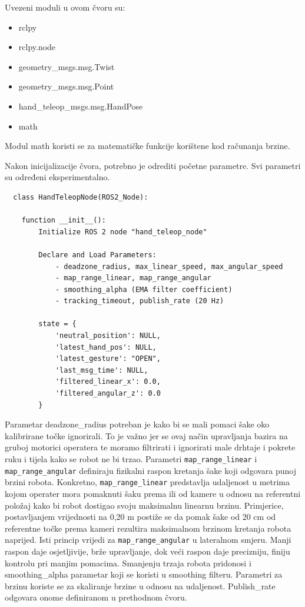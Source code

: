 \documentclass[12pt,a4paper,oneside]{report}
\begin{document}
Uvezeni moduli u ovom čvoru su:
\begin{itemize}
  \item rclpy
  \item rclpy.node
  \item geometry\_msgs.msg.Twist
  \item geometry\_msgs.msg.Point
  \item hand\_teleop\_msgs.msg.HandPose
  \item math
\end{itemize}

Modul math koristi se za matematičke funkcije korištene kod računanja brzine.

Nakon inicijalizacije čvora, potrebno je odrediti početne parametre. Svi parametri su određeni eksperimentalno. 

\begin{verbatim}
  class HandTeleopNode(ROS2_Node):

    function __init__():
        Initialize ROS 2 node "hand_teleop_node"

        Declare and Load Parameters:
            - deadzone_radius, max_linear_speed, max_angular_speed
            - map_range_linear, map_range_angular
            - smoothing_alpha (EMA filter coefficient)
            - tracking_timeout, publish_rate (20 Hz)

        state = {
            'neutral_position': NULL,
            'latest_hand_pos': NULL,
            'latest_gesture': "OPEN",
            'last_msg_time': NULL,
            'filtered_linear_x': 0.0,
            'filtered_angular_z': 0.0
        }
\end{verbatim}

Parametar deadzone\_radius potreban je kako bi se mali pomaci šake oko kalibrirane točke ignorirali. To je 
važno jer se ovaj način upravljanja bazira na gruboj motorici operatera te moramo filtrirati i ignorirati 
male drhtaje i pokrete ruku i tijela kako se robot ne bi trzao. 
Parametri \texttt{map\_range\_linear} i \texttt{map\_range\_angular} definiraju fizikalni raspon kretanja 
šake koji odgovara punoj brzini robota. Konkretno, \texttt{map\_range\_linear} predstavlja udaljenost u 
metrima kojom operater mora pomaknuti šaku prema ili od kamere u odnosu na referentni položaj kako bi robot 
dostigao svoju maksimalnu linearnu brzinu. Primjerice, postavljanjem vrijednosti na 0,20 m postiže se da 
pomak šake od 20 cm od referentne točke prema kameri rezultira maksimalnom brzinom kretanja robota naprijed. 
Isti princip vrijedi za \texttt{map\_range\_angular} u lateralnom smjeru. Manji raspon daje osjetljivije, 
brže upravljanje, dok veći raspon daje precizniju, finiju kontrolu pri manjim pomacima.
Smanjenju trzaja robota pridonosi i smoothing\_alpha parametar koji se koristi u smoothing filteru. 
Parametri za brzinu koriste se za skaliranje brzine u odnosu na udaljenost. Publish\_rate odgovara onome 
definiranom u prethodnom čvoru. 
\end{document}
